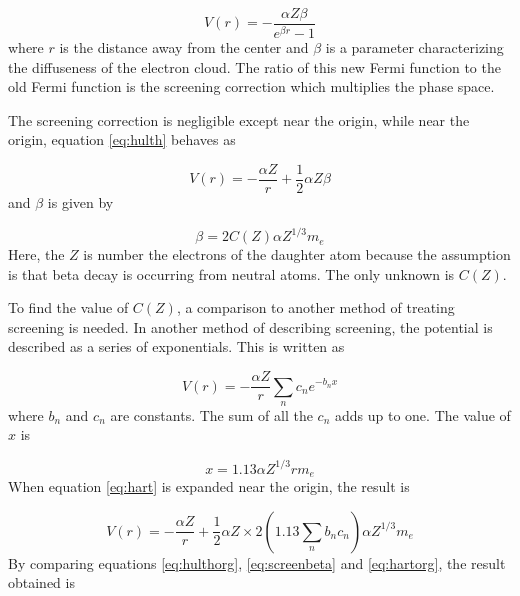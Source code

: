 \documentclass[../MaxHughesThesis.tex]{subfiles}
\begin{document}
\begin{equation}
	V(r) = -\frac{\alpha Z \beta}{e^{\beta r} - 1}
	\label{eq:hulth}
\end{equation}
where $r$ is the distance away from the center and $\beta$ is a parameter characterizing the diffuseness of the electron cloud.
The ratio of this new Fermi function to the old Fermi function is the screening correction which multiplies the phase space. 

The screening correction is negligible except near the origin, while near the origin, equation \ref{eq:hulth} behaves as %

\begin{equation}
	V(r) = -\frac{\alpha Z}{r} + \frac{1}{2}\alpha Z \beta
	\label{eq:hulthorg}
\end{equation}
and $\beta$ is given by \cite{Buh84} %
	
\begin{equation}
	\beta = 2C(Z)\alpha Z^{1/3} m_{e}
	\label{eq:screenbeta}
\end{equation}
Here, the $Z$ is number the electrons of the daughter atom because the assumption is that beta decay is occurring from neutral atoms.
The only unknown is $C(Z)$.

To find the value of $C(Z)$, a comparison to another method of treating screening is needed.
In another method of describing screening, the potential is described as a series of exponentials.
This is written as \cite{Bya56} %

\begin{equation}
	V(r) = -\frac{\alpha Z}{r}\sum_{n}c_{n}e^{-b_{n} x}
	\label{eq:hart}
\end{equation}
where $b_{n}$ and $c_{n}$ are constants.
The sum of all the $c_{n}$ adds up to one.
The value of $x$ is \cite{Bya56} %

\begin{equation}
	x = 1.13 \alpha Z^{1/3} r m_{e}
	\label{eq:screeningx}
\end{equation}
When equation \ref{eq:hart} is expanded near the origin, the result is %

\begin{equation}
	V(r) = - \frac{\alpha Z}{r} + \frac{1}{2} \alpha Z \times 2 (1.13 \sum_{n} b_{n} c_{n}) \alpha Z^{1/3} m_{e} 
	\label{eq:hartorg}
\end{equation}
By comparing equations \ref{eq:hulthorg}, \ref{eq:screenbeta} and \ref{eq:hartorg}, the result obtained is %
\end{document}
